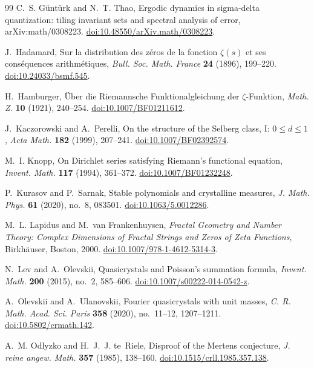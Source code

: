 \documentclass[11pt,reqno]{amsart}
\numberwithin{equation}{section}
\theoremstyle{plain}
\theoremstyle{definition}
\theoremstyle{remark}
\begin{document}
\begin{thebibliography}{99}
C.~S. G\"unt\"urk and N.~T. Thao, Ergodic dynamics in sigma-delta quantization: tiling invariant sets and spectral analysis of error, arXiv:math/0308223.
\href{https://doi.org/10.48550/arXiv.math/0308223}{doi:10.48550/arXiv.math/0308223}.

J.~Hadamard, Sur la distribution des z\'eros de la fonction $\zeta(s)$ et ses cons\'equences arithm\'etiques, \emph{Bull. Soc. Math. France} \textbf{24} (1896), 199--220.
\href{https://doi.org/10.24033/bsmf.545}{doi:10.24033/bsmf.545}.

H.~Hamburger, \"Uber die Riemannsche Funktionalgleichung der $\zeta$-Funktion, \emph{Math. Z.} \textbf{10} (1921), 240--254.
\href{https://doi.org/10.1007/BF01211612}{doi:10.1007/BF01211612}.

J.~Kaczorowski and A.~Perelli, On the structure of the Selberg class, I: $0\le d\le1$, \emph{Acta Math.} \textbf{182} (1999), 207--241.
\href{https://doi.org/10.1007/BF02392574}{doi:10.1007/BF02392574}.

M.~I. Knopp, On Dirichlet series satisfying Riemann's functional equation, \emph{Invent. Math.} \textbf{117} (1994), 361--372.
\href{https://doi.org/10.1007/BF01232248}{doi:10.1007/BF01232248}.

P.~Kurasov and P.~Sarnak, Stable polynomials and crystalline measures, \emph{J. Math. Phys.} \textbf{61} (2020), no.~8, 083501.
\href{https://doi.org/10.1063/5.0012286}{doi:10.1063/5.0012286}.

M.~L. Lapidus and M.~van Frankenhuysen, \emph{Fractal Geometry and Number Theory: Complex Dimensions of Fractal Strings and Zeros of Zeta Functions}, Birkh\"auser, Boston, 2000.
\href{https://doi.org/10.1007/978-1-4612-5314-3}{doi:10.1007/978-1-4612-5314-3}.

N.~Lev and A.~Olevskii, Quasicrystals and Poisson's summation formula, \emph{Invent. Math.} \textbf{200} (2015), no.~2, 585--606.
\href{https://doi.org/10.1007/s00222-014-0542-z}{doi:10.1007/s00222-014-0542-z}.

A.~Olevskii and A.~Ulanovskii, Fourier quasicrystals with unit masses, \emph{C. R. Math. Acad. Sci. Paris} \textbf{358} (2020), no.~11--12, 1207--1211.
\href{https://doi.org/10.5802/crmath.142}{doi:10.5802/crmath.142}.

A.~M. Odlyzko and H.~J.~J. te~Riele, Disproof of the Mertens conjecture, \emph{J. reine angew. Math.} \textbf{357} (1985), 138--160.
\href{https://doi.org/10.1515/crll.1985.357.138}{doi:10.1515/crll.1985.357.138}.


\end{thebibliography}
\end{document}

